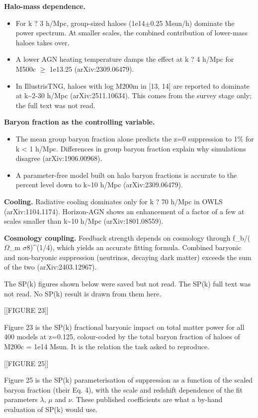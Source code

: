 \documentclass[11pt,a4paper]{article}
\begin{document}
\textbf{Halo-mass dependence.}

\begin{itemize}
  \item For k ? 3 h/Mpc, group-sized haloes (1e14$\pm$0.25 Msun/h) dominate the power spectrum. At smaller scales, the combined contribution of lower-mass haloes takes over.
  \item A lower AGN heating temperature damps the effect at k ? 4 h/Mpc for M500c $\geq$ 1e13.25 (arXiv:2309.06479).
  \item In IllustrisTNG, haloes with log M200m in [13, 14] are reported to dominate at k\textasciitilde{}2-30 h/Mpc (arXiv:2511.10634). This comes from the survey stage only; the full text was not read.
\end{itemize}
\textbf{Baryon fraction as the controlling variable.}

\begin{itemize}
  \item The mean group baryon fraction alone predicts the z=0 suppression to 1\% for k \textless{} 1 h/Mpc. Differences in group baryon fraction explain why simulations disagree (arXiv:1906.00968).
  \item A parameter-free model built on halo baryon fractions is accurate to the percent level down to k\textasciitilde{}10 h/Mpc (arXiv:2309.06479).
\end{itemize}
\textbf{Cooling.} Radiative cooling dominates only for k ? 70 h/Mpc in OWLS (arXiv:1104.1174). Horizon-AGN shows an enhancement of a factor of a few at scales smaller than k\textasciitilde{}10 h/Mpc (arXiv:1801.08559).

\textbf{Cosmology coupling.} Feedback strength depends on cosmology through f\_b/($\Omega$\_m $\sigma$8)\textasciicircum{}(1/4), which yields an accurate fitting formula. Combined baryonic and non-baryonic suppression (neutrinos, decaying dark matter) exceeds the sum of the two (arXiv:2403.12967).

The SP(k) figures shown below were saved but not read. The SP(k) full text was not read. No SP(k) result is drawn from them here.

[[FIGURE 23]]

Figure 23 is the SP(k) fractional baryonic impact on total matter power for all 400 models at z=0.125, colour-coded by the total baryon fraction of haloes of M200c = 1e14 Msun. It is the relation the task asked to reproduce.

[[FIGURE 25]]

Figure 25 is the SP(k) parameterisation of suppression as a function of the scaled baryon fraction (their Eq. 4), with the scale and redshift dependence of the fit parameters $\lambda$, $\mu$ and $\nu$. These published coefficients are what a by-hand evaluation of SP(k) would use.
\end{document}
